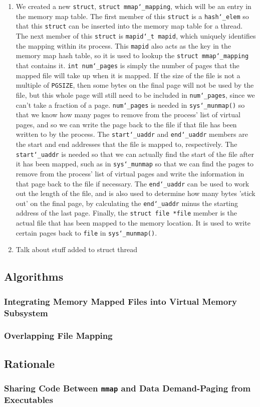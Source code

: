 \documentclass{article}
\renewcommand{\_}{\char`_}
\begin{document}
\begin{enumerate}

\item

We created a new \texttt{struct}, \texttt{struct mmap\_mapping}, which will be an entry in the memory map table. The first member of this \texttt{struct} is a \texttt{hash\_elem} so that this \texttt{struct} can be inserted into the memory map table for a thread. The next member of this \texttt{struct} is \texttt{mapid\_t mapid}, which uniquely identifies the mapping within its process. This \texttt{mapid} also acts as the key in the memory map hash table, so it is used to lookup the \texttt{struct mmap\_mapping} that contains it. \texttt{int num\_pages} is simply the number of pages that the mapped file will take up when it is mapped. If the size of the file is not a multiple of \texttt{PGSIZE}, then some bytes on the final page will not be used by the file, but this whole page will still need to be included in \texttt{num\_pages}, since we can't take a fraction of a page. \texttt{num\_pages} is needed in \texttt{sys\_munmap()} so that we know how many pages to remove from the process' list of virtual pages, and so we can write the page back to the file if that file has been written to by the process. The \texttt{start\_uaddr} and \texttt{end\_uaddr} members are the start and end addresses that the file is mapped to, respectively. The \texttt{start\_uaddr} is needed so that we can actually find the start of the file after it has been mapped, such as in \texttt{sys\_munmap} so that we can find the pages to remove from the process' list of virtual pages and write the information in that page back to the file if necessary. The \texttt{end\_uaddr} can be used to work out the length of the file, and is also used to determine how many bytes 'stick out' on the final page, by calculating the \texttt{end\_uaddr} minus the starting address of the last page. Finally, the \texttt{struct file *file} member is the actual file that has been mapped to the memory location. It is used to write certain pages back to \texttt{file} in \texttt{sys\_munmap()}.

\item

Talk about stuff added to struct thread

\end{enumerate}

\subsection{Algorithms}

\subsubsection{Integrating Memory Mapped Files into Virtual Memory Subsystem}

\subsubsection{Overlapping File Mapping}

\subsection{Rationale}

\subsubsection{Sharing Code Between \texttt{mmap} and Data Demand-Paging from Executables}
\end{document}
